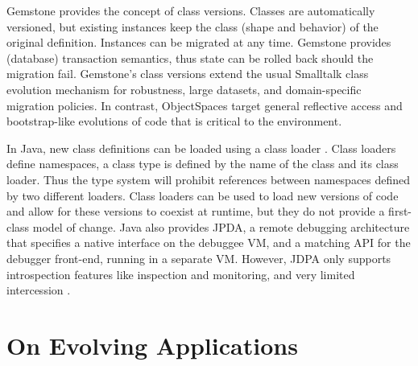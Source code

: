 Gemstone \cite{Otis91a} provides the concept of class versions. Classes are
automatically versioned, but existing instances keep the class (shape and
behavior) of the original definition. Instances can be migrated at any time.
Gemstone provides (database) transaction semantics, thus state can be rolled
back should the migration fail.
Gemstone's class versions extend the usual Smalltalk class evolution mechanism for robustness, 
large datasets, and domain-specific migration policies. In contrast, ObjectSpaces target general 
reflective access and bootstrap-like evolutions of code that is critical to the environment.

In Java, new class definitions can be loaded using a class loader
\cite{Lian98a}. Class loaders define namespaces, a class type is defined by the
name of the class and its class loader. Thus the type system will prohibit
references between namespaces defined by two different loaders. Class loaders
can be used to load new versions of code and allow for these versions to coexist
at runtime, but they do not provide a first-class model of change.
Java also provides JPDA, a remote debugging architecture that specifies a native interface on the debuggee VM, and a matching API for the debugger front-end, running in a separate VM. However, JDPA only supports introspection features like  inspection and monitoring, and very limited intercession \cite{jdpa}.


\section{On Evolving Applications}

